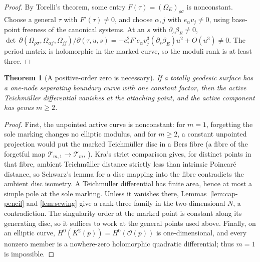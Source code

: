 \documentclass[12pt]{article}
\newcommand{\T}{\mathcal T}
\newtheorem{theorem}{Theorem}
\theoremstyle{remark}
\begin{document}
\begin{proof}
By Torelli's theorem, some entry
\(F(\tau)=(\Omega_E)_{\rho\sigma}\) is nonconstant.
Choose a general \(\tau\) with \(F'(\tau)\ne0\), and
choose \(\alpha,j\) with \(e_\alpha v_j\ne0\), using
base-point freeness of the canonical systems.
At an \(s\) with \(\partial_s\beta_E\ne0\),
\(\det\,\partial(\Omega_{\rho\sigma},\Omega_{\alpha j},\Omega_{jj})
/\partial(\tau,u,s)
=-c_*^2F'e_\alpha v_j^3(\partial_s\beta_E)u^2+O(u^3)\ne0\).
The period matrix is holomorphic in the marked curve, so the
moduli rank is at least three.
\end{proof}

\begin{theorem}[A positive-order zero is necessary]\label{thm:zero}
If a totally geodesic surface has a one-node separating boundary
curve with one constant factor, then the active Teichm\"uller
differential vanishes at the attaching point, and the active
component has genus \(m\ge2\).
\end{theorem}
\begin{proof}
First, the unpointed active curve is nonconstant: for \(m=1\),
forgetting the sole marking changes no elliptic modulus, and for
\(m\ge2\), a constant unpointed projection would put the marked Teichm\"uller disc in
a Bers fibre (a fibre of the forgetful map
\(\T_{m,1}\to\T_m\), \cite[Section 9(B)]{BersFinite}). Kra's strict
comparison \cite[Theorem 3, Section 10]{Kra} gives, for distinct
points in that fibre, ambient Teichm\"uller distance
strictly less than intrinsic Poincar\'e distance, so
Schwarz's lemma for a disc mapping into the fibre
contradicts the ambient disc isometry.
A Teichm\"uller differential has finite area, hence at most a
simple pole at the sole marking. Unless it vanishes there,
Lemmas~\ref{lem:cap-pencil} and \ref{lem:sewing} give
a rank-three family in the two-dimensional \(N\),
a contradiction. The singularity order at the marked
point is constant along its generating disc, so it
suffices to work at the general points used above.
Finally, on an elliptic curve,
\(H^0(K^2(p))=H^0(\mathcal O(p))\) is one-dimensional, and
every nonzero member is a nowhere-zero holomorphic
quadratic differential; thus \(m=1\) is impossible.
\end{proof}
\end{document}
